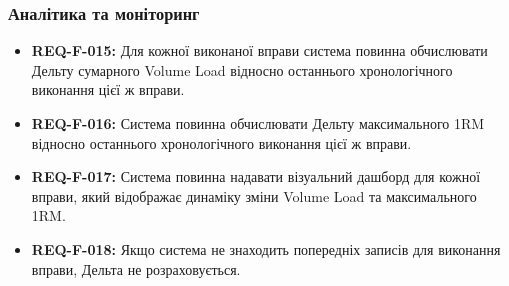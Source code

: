 \documentclass[12pt]{article}
\begin{document}
\subsubsection*{Аналітика та моніторинг}
\begin{itemize}
    \item \textbf{REQ-F-015:} Для кожної виконаної вправи система повинна обчислювати Дельту сумарного Volume Load відносно останнього хронологічного виконання цієї ж вправи.
    \item \textbf{REQ-F-016:} Система повинна обчислювати Дельту максимального 1RM відносно останнього хронологічного виконання цієї ж вправи.
    \item \textbf{REQ-F-017:} Система повинна надавати візуальний дашборд для кожної вправи, який відображає динаміку зміни Volume Load та максимального 1RM.
    \item \textbf{REQ-F-018:} Якщо система не знаходить попередніх записів для виконання вправи, Дельта не розраховується.
\end{itemize}
\end{document}
